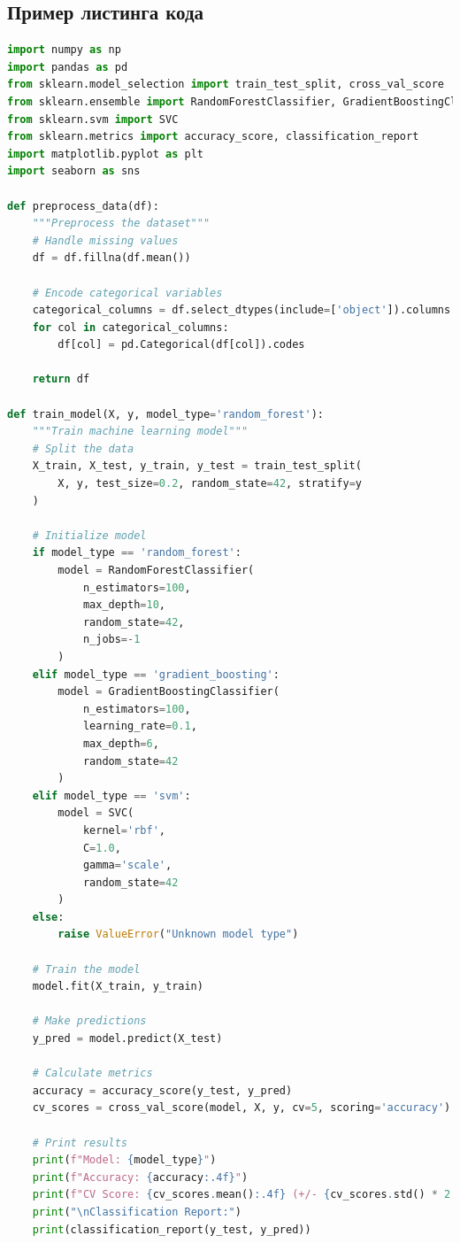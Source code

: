 \subsection{Пример листинга кода}

\begin{lstlisting}[language=Python, caption={Пример алгоритма машинного обучения}, label={lst:ml_algorithm}, style=breakable]
import numpy as np
import pandas as pd
from sklearn.model_selection import train_test_split, cross_val_score
from sklearn.ensemble import RandomForestClassifier, GradientBoostingClassifier
from sklearn.svm import SVC
from sklearn.metrics import accuracy_score, classification_report
import matplotlib.pyplot as plt
import seaborn as sns

def preprocess_data(df):
    """Preprocess the dataset"""
    # Handle missing values
    df = df.fillna(df.mean())
    
    # Encode categorical variables
    categorical_columns = df.select_dtypes(include=['object']).columns
    for col in categorical_columns:
        df[col] = pd.Categorical(df[col]).codes
    
    return df

def train_model(X, y, model_type='random_forest'):
    """Train machine learning model"""
    # Split the data
    X_train, X_test, y_train, y_test = train_test_split(
        X, y, test_size=0.2, random_state=42, stratify=y
    )
    
    # Initialize model
    if model_type == 'random_forest':
        model = RandomForestClassifier(
            n_estimators=100,
            max_depth=10,
            random_state=42,
            n_jobs=-1
        )
    elif model_type == 'gradient_boosting':
        model = GradientBoostingClassifier(
            n_estimators=100,
            learning_rate=0.1,
            max_depth=6,
            random_state=42
        )
    elif model_type == 'svm':
        model = SVC(
            kernel='rbf',
            C=1.0,
            gamma='scale',
            random_state=42
        )
    else:
        raise ValueError("Unknown model type")
    
    # Train the model
    model.fit(X_train, y_train)
    
    # Make predictions
    y_pred = model.predict(X_test)
    
    # Calculate metrics
    accuracy = accuracy_score(y_test, y_pred)
    cv_scores = cross_val_score(model, X, y, cv=5, scoring='accuracy')
    
    # Print results
    print(f"Model: {model_type}")
    print(f"Accuracy: {accuracy:.4f}")
    print(f"CV Score: {cv_scores.mean():.4f} (+/- {cv_scores.std() * 2:.4f})")
    print("\nClassification Report:")
    print(classification_report(y_test, y_pred))
    

\end{lstlisting}
